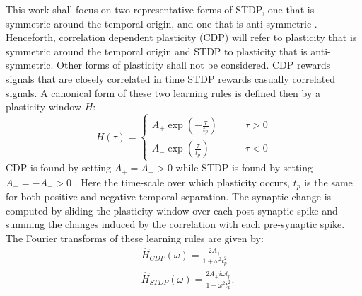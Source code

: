 This work shall focus on two representative forms of STDP, one that is symmetric around the temporal origin, and one that is anti-symmetric \cite{Abbott2000-gl}. Henceforth, correlation dependent plasticity (CDP) will refer to plasticity that is symmetric around the temporal origin and STDP to plasticity that is anti-symmetric. Other forms of plasticity shall not be considered. CDP rewards signals that are closely correlated in time STDP rewards casually correlated signals. A canonical form of these two learning rules is defined then by a plasticity window $H$:
\begin{equation}
H(\tau) = \begin{cases} \label{STDPcanonicalform}
A_+ \exp(-\frac{\tau}{t_p}) &\qquad \tau >0\\
A_- \exp(\frac{\tau}{t_p}) &\qquad \tau <0 
\end{cases}
\end{equation}
CDP is found by setting $A_+=A_->0$ while STDP is found by setting $A_+=-A_->0$ \cite{Robinson2011-ve, Abbott2000-gl}. Here the time-scale over which plasticity occurs, $t_p$ is the same for both positive and negative temporal separation. The synaptic change is computed by sliding the plasticity window over each post-synaptic spike and summing the changes induced by the correlation with each pre-synaptic spike. The Fourier transforms of these learning rules are given by:
\begin{align}
& \hat{H}_{CDP} (\omega)= \frac{2A_+}{1+\omega^2 t_p^2} \label{CDPrule} \\ 
& \hat{H}_{STDP} (\omega)= \frac{2A_+ i \omega t_p }{1+\omega^2 t_p^2}. \label{STDPrule}
\end{align}
